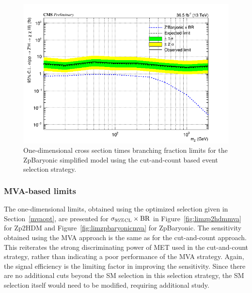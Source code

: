 \begin{figure}[tbh]
\centering
\includegraphics[width=5in]{figures/sigma_limits_4mu_ZpBaryonic.png}
\caption{One-dimensional cross section times branching fraction limits for the ZpBaryonic simplified model using the cut-and-count based event selection strategy.}
\label{fig:limzpbaryonic}
\end{figure}

\subsubsection{MVA-based limits}

The one-dimensional limits, obtained using the optimized selection given in Section~\ref{mvaopt}, are presented for $\sigma_{95\% \rm{CL}}\times \rm{BR}$ in Figure~\ref{fig:limzp2hdmmva} for Zp2HDM and Figure~\ref{fig:limzpbaryonicmva} for ZpBaryonic. The sensitivity obtained using the MVA approach is the same as for the cut-and-count approach. This reiterates the strong discriminating power of MET used in the cut-and-count strategy, rather than indicating a poor performance of the MVA strategy. Again, the signal efficiency is the limiting factor in improving the sensitivity. Since there are no additional cuts beyond the SM selection in this selection strategy, the SM selection itself would need to be modified, requiring additional study. 

